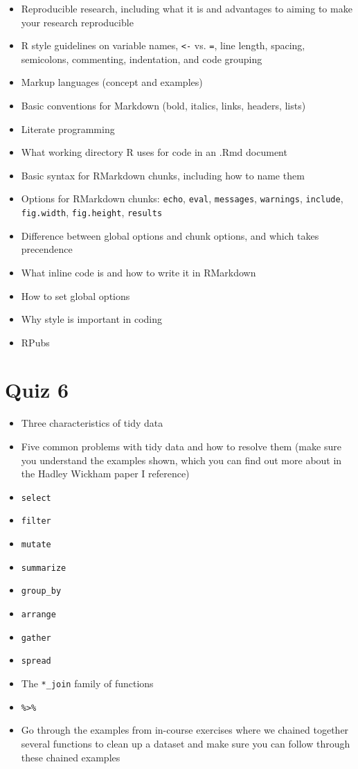 \documentclass[]{book}
\providecommand{\tightlist}{%
  \setlength{\itemsep}{0pt}\setlength{\parskip}{0pt}}
\theoremstyle{definition}
\theoremstyle{definition}
\theoremstyle{definition}
\theoremstyle{remark}
\begin{document}
\begin{itemize}
\tightlist
\item
  Reproducible research, including what it is and advantages to aiming
  to make your research reproducible
\item
  R style guidelines on variable names, \texttt{\textless{}-} vs.
  \texttt{=}, line length, spacing, semicolons, commenting, indentation,
  and code grouping
\item
  Markup languages (concept and examples)
\item
  Basic conventions for Markdown (bold, italics, links, headers, lists)
\item
  Literate programming
\item
  What working directory R uses for code in an .Rmd document
\item
  Basic syntax for RMarkdown chunks, including how to name them
\item
  Options for RMarkdown chunks: \texttt{echo}, \texttt{eval},
  \texttt{messages}, \texttt{warnings}, \texttt{include},
  \texttt{fig.width}, \texttt{fig.height}, \texttt{results}
\item
  Difference between global options and chunk options, and which takes
  precendence
\item
  What inline code is and how to write it in RMarkdown
\item
  How to set global options
\item
  Why style is important in coding
\item
  RPubs
\end{itemize}

\section{Quiz 6}\label{quiz-6}

\begin{itemize}
\tightlist
\item
  Three characteristics of tidy data
\item
  Five common problems with tidy data and how to resolve them (make sure
  you understand the examples shown, which you can find out more about
  in the Hadley Wickham paper I reference)
\item
  \texttt{select}
\item
  \texttt{filter}
\item
  \texttt{mutate}
\item
  \texttt{summarize}
\item
  \texttt{group\_by}
\item
  \texttt{arrange}
\item
  \texttt{gather}
\item
  \texttt{spread}
\item
  The \texttt{*\_join} family of functions
\item
  \texttt{\%\textgreater{}\%}
\item
  Go through the examples from in-course exercises where we chained
  together several functions to clean up a dataset and make sure you can
  follow through these chained examples
\end{itemize}
\end{document}
